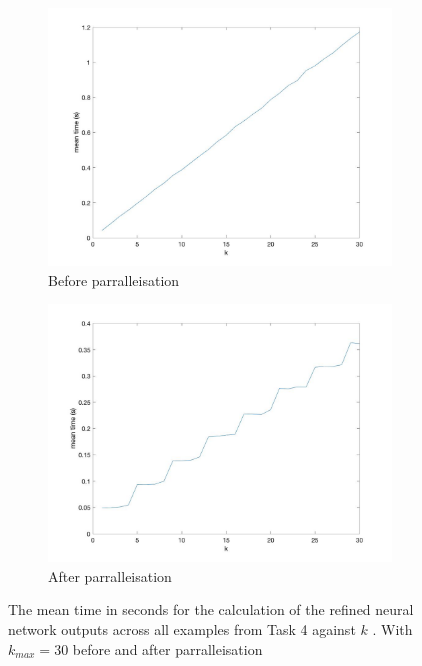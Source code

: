 \documentclass[11pt]{article}
\begin{document}
\begin{figure}
    \centering
    \begin{subfigure}{.5\textwidth} 
        \centering \includegraphics[width=0.8\columnwidth]{Figures/Task4tvk.jpg}
        \caption{\label{fig:Task4_1a}Before parralleisation
        }
    \end{subfigure}%
    \begin{subfigure}{.5\textwidth} 
        \centering \includegraphics[width=0.8\columnwidth]{Figures/Task4tvk_parrallel.jpg}
        \caption{\label{fig:Task4_1b}After parralleisation
        }
    \end{subfigure}
    \caption{The mean time in seconds for the calculation of the refined neural network outputs across all examples from Task 4 against $k$  . With $k_{max}=30$ before and after parralleisation}
    \label{fig:Task4_1}
\end{figure}
\end{document}
